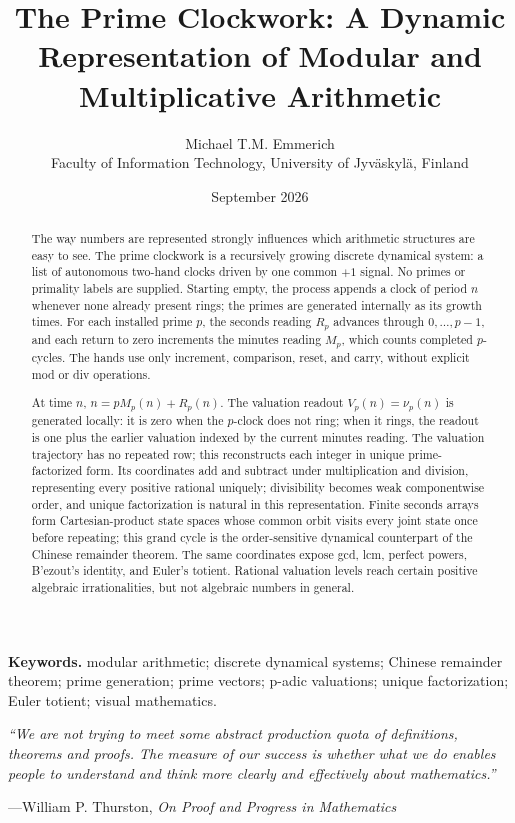 \documentclass[11pt,a4paper]{article}
\title{\textbf{The Prime Clockwork: A Dynamic Representation of Modular and Multiplicative Arithmetic}}
\author{Michael T.M. Emmerich\\[-1mm]
\small Faculty of Information Technology, University of Jyv\"askyl\"a, Finland}
\date{September 2026}
\theoremstyle{clockplain}
\theoremstyle{definition}
\theoremstyle{remark}
\begin{document}
\maketitle
\vspace{-4mm}

\begin{abstract}
The way numbers are represented strongly influences which arithmetic structures are easy to see. The prime clockwork is a recursively growing discrete dynamical system: a list of autonomous two-hand clocks driven by one common $+1$ signal. No primes or primality labels are supplied. Starting empty, the process appends a clock of period $n$ whenever none already present rings; the primes are generated internally as its growth times. For each installed prime $p$, the seconds reading $R_p$ advances through $0,\ldots,p-1$, and each return to zero increments the minutes reading $M_p$, which counts completed $p$-cycles. The hands use only increment, comparison, reset, and carry, without explicit mod or div operations.

At time $n$, $n=pM_p(n)+R_p(n)$. The valuation readout $V_p(n)=\nu_p(n)$ is generated locally: it is zero when the $p$-clock does not ring; when it rings, the readout is one plus the earlier valuation indexed by the current minutes reading. The valuation trajectory has no repeated row; this reconstructs each integer in unique prime-factorized form. Its coordinates add and subtract under multiplication and division, representing every positive rational uniquely; divisibility becomes weak componentwise order, and unique factorization is natural in this representation. Finite seconds arrays form Cartesian-product state spaces whose common orbit visits every joint state once before repeating; this grand cycle is the order-sensitive dynamical counterpart of the Chinese remainder theorem. The same coordinates expose gcd, lcm, perfect powers, B'ezout's identity, and Euler's totient. Rational valuation levels reach certain positive algebraic irrationalities, but not algebraic numbers in general.
\end{abstract}

\textbf{Keywords.} modular arithmetic; discrete dynamical systems; Chinese remainder theorem; prime generation; prime vectors; p-adic valuations; unique factorization; Euler totient; visual mathematics.

\begin{flushright}
\begin{minipage}{0.86\textwidth}
\small\itshape
``We are not trying to meet some abstract production quota of definitions, theorems and proofs. The measure of our success is whether what we do enables people to understand and think more clearly and effectively about mathematics.''
\par\smallskip
\raggedleft\normalfont---William P. Thurston, \emph{On Proof and Progress in Mathematics}~\cite[p.~163]{Thurston1994}
\end{minipage}
\end{flushright}
\vspace{1mm}
\end{document}
